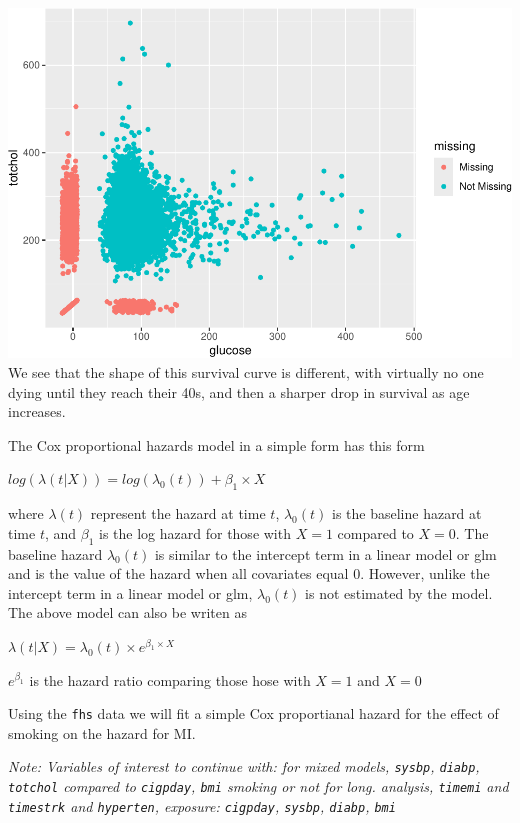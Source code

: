\documentclass[
]{book}
\begin{document}
\includegraphics{adv_epi_analysis_files/figure-latex/unnamed-chunk-177-1.pdf}
We see that the shape of this survival curve is different, with virtually no one dying until they reach their 40s, and then a sharper drop in survival as age increases.

The Cox proportional hazards model in a simple form has this form

\(log(\lambda(t|X))=log(\lambda_{0}(t))+\beta_{1}\times X\)

where \(\lambda(t)\) represent the hazard at time \(t\), \(\lambda_{0}(t)\) is the baseline hazard at time \(t\), and \(\beta_{1}\) is the log hazard for those with \(X=1\) compared to \(X=0\). The baseline hazard \(\lambda_{0}(t)\) is similar to the intercept term in a linear model or glm and is the value of the hazard when all covariates equal 0. However, unlike the intercept term in a linear model or glm, \(\lambda_{0}(t)\) is not estimated by the model.
The above model can also be writen as

\(\lambda(t|X)=\lambda_{0}(t)\times e^{\beta_{1}\times X}\)

\(e^{\beta_{1}}\) is the hazard ratio comparing those hose with \(X=1\) and \(X=0\)

Using the \texttt{fhs} data we will fit a simple Cox proportianal hazard for the effect of smoking on the hazard for MI.

\emph{Note: Variables of interest to continue with:
for mixed models, \texttt{sysbp}, \texttt{diabp}, \texttt{totchol} compared to \texttt{cigpday}, \texttt{bmi} smoking or not
for long. analysis, \texttt{timemi} and \texttt{timestrk} and \texttt{hyperten}, exposure: \texttt{cigpday}, \texttt{sysbp}, \texttt{diabp}, \texttt{bmi}}
\end{document}
